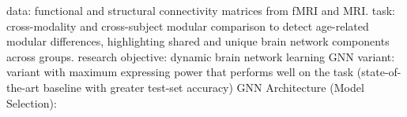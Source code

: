 data: functional and structural connectivity matrices from fMRI and MRI. 
task: cross-modality and cross-subject modular comparison 
to detect age-related modular differences, highlighting shared 
and unique brain network components across groups. 
research objective: dynamic brain network learning \cite{Tang2023}
GNN variant: variant with maximum expressing power that performs
well on the task (state-of-the-art baseline with greater test-set
accuracy)
GNN Architecture (Model Selection): 



